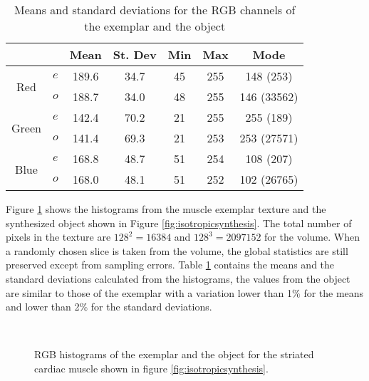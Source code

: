 \begin{table}[h]
\centering
\begin{tabular}{|c|c|c|c|c|c|c|}
  \hline
  & & Mean & St. Dev & Min & Max & Mode\\
  \hline
  \multirow{2}{*}{Red} & $e$ & 189.6  & 34.7  & 45 & 255 & 148 (253) \\
		       & $o$ & 188.7 & 34.0 & 48 & 255 & 146 (33562)\\
  \hline
  \multirow{2}{*}{Green} & $e$ & 142.4 & 70.2 & 21 & 255 & 255 (189)\\
		         & $o$ & 141.4 & 69.3 & 21 & 253 & 253 (27571)\\
  \hline
  \multirow{2}{*}{Blue} & $e$ & 168.8  & 48.7 & 51 & 254 & 108 (207)\\
		        & $o$ & 168.0  & 48.1 & 51 & 252 & 102 (26765) \\
  \hline
\end{tabular}
\caption{Means and standard deviations for the RGB channels of the exemplar and the object}
\label{tab:statshisto} 
\end{table}

Figure \ref{fig:histogramsHisto} shows the histograms from the muscle exemplar texture and the synthesized object shown 
in Figure \ref{fig:isotropicsynthesis}. The total number of pixels in the texture are $128^2 = 16384$ and
$128^3 = 2097152$ for the volume. When a randomly chosen slice is taken from the volume, the global statistics are still preserved
except from sampling errors.
Table \ref{tab:statshisto} contains the means and the standard deviations calculated from the histograms, the values
from the object are similar to those of the exemplar with a variation lower than 1$\%$ for the means and lower than 2$\%$ for the standard deviations. 

\begin{figure}[h!]
 \centering  
 \\
 \caption[RGB histograms of exemplar and synthesized solid.]{RGB histograms of the exemplar and the object for the striated
          cardiac muscle shown in figure \ref{fig:isotropicsynthesis}.}
 \label{fig:histogramsHisto} 
\end{figure}


